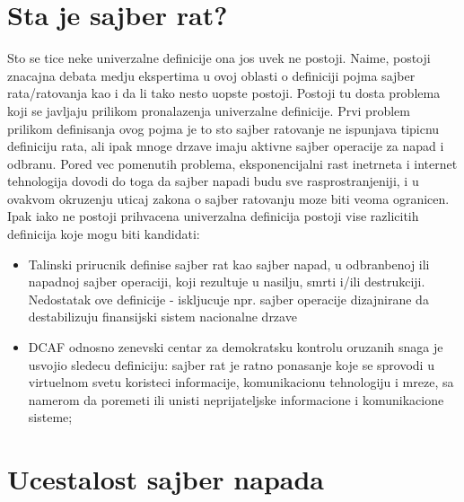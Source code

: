 \documentclass[a4paper]{article}
\begin{document}
{\section{Sta je sajber rat?}
Sto se tice neke univerzalne definicije ona jos uvek ne postoji.
Naime, postoji znacajna debata medju ekspertima u ovoj oblasti o definiciji pojma sajber rata/ratovanja kao i da li tako nesto uopste postoji. Postoji tu dosta problema koji se javljaju prilikom pronalazenja univerzalne definicije.
Prvi problem prilikom definisanja ovog pojma je to sto sajber ratovanje ne ispunjava tipicnu definiciju rata, ali ipak mnoge drzave imaju aktivne sajber operacije za napad i odbranu. Pored vec pomenutih problema, eksponencijalni rast inetrneta i internet tehnologija dovodi do toga da sajber napadi budu sve rasprostranjeniji, i u ovakvom okruzenju uticaj zakona o sajber ratovanju moze biti veoma ogranicen.
Ipak iako ne postoji prihvacena univerzalna definicija postoji vise razlicitih definicija koje mogu biti kandidati:
\begin{itemize}
\item  Talinski prirucnik definise sajber rat kao sajber napad, u
odbranbenoj ili napadnoj sajber operaciji, koji rezultuje u
nasilju, smrti i/ili destrukciji. Nedostatak ove definicije -
iskljucuje npr. sajber operacije dizajnirane da destabilizuju
finansijski sistem nacionalne drzave
\item DCAF odnosno zenevski centar za demokratsku kontrolu oruzanih snaga je usvojio sledecu definiciju: sajber rat je ratno ponasanje koje se sprovodi u virtuelnom svetu koristeci informacije, komunikacionu tehnologiju i mreze, sa namerom da poremeti ili unisti neprijateljske informacione i komunikacione sisteme;


\end{itemize} 




\section{Ucestalost sajber napada}	
\label{sec:termini_i_citiranje}

}
\end{document}

